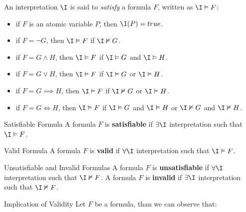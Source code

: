 An interpretation $\I$ is said to \textit{satisfy} a formula $F$, 
written as $\I \vDash F$:
\begin{itemize}
    \item if $F$ is an atomic variable $P$, then $\I(P) = true$.
    \item if $F = \neg G$, then $\I \vDash F$ if $\I \nvDash G$.
    \item if $F = G \land H$, then $\I \vDash F$ if $\I \vDash G$ and $\I \vDash H$.
    \item if $F = G \lor H$, then $\I \vDash F$ if $\I \vDash G$ or $\I \vDash H$.
    \item if $F = G \implies H$, then $\I \vDash F$ if $\I \nvDash G$ or $\I \vDash H$.
    \item if $F = G \iff H$, then $\I \vDash F$ if $\I \vDash G$ and $\I \vDash H$ or
    $\I \nvDash G$ and $\I \nvDash H$.
\end{itemize}

\begin{definition}{Satisfiable Formula}
    A formula $F$ is \textbf{satisfiable} if $\exists \I$ 
    interpretation such that $\I \vDash F$.
\end{definition}

\begin{definition}{Valid Formula}
    A formula $F$ is \textbf{valid} if $\forall \I$ 
    interpretation such that $\I \vDash F$.
\end{definition}

\begin{remark}{Unsatisfiable and Invalid Formulas}
    A formula $F$ is \textbf{unsatisfiable} if $\forall \I$ interpretation 
    such that $\I \nvDash F$.
    A formula $F$ is \textbf{invalid} if $\exists \I$ interpretation 
    such that $\I \nvDash F$.
\end{remark}

\begin{remark}{Implication of Validity}
    Let $F$ be a formula, than we can observe that:
\end{remark}

